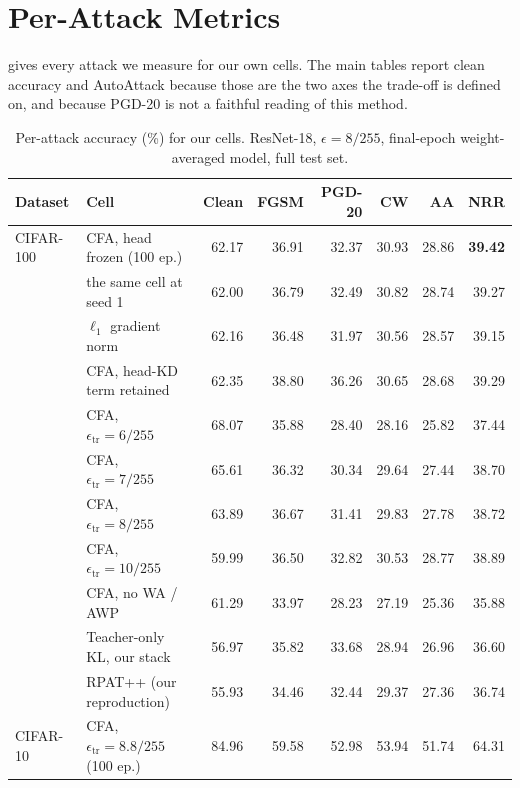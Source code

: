 \section{Per-Attack Metrics}
\label{app:fullmetrics}

 gives every attack we measure for our own cells. The main tables report clean
accuracy and AutoAttack because those are the two axes the trade-off is defined on, and because
PGD-20 is not a faithful reading of this method.

\begin{table}[!htbp]
  \centering \small \setlength{\tabcolsep}{4.5pt}
  \caption{Per-attack accuracy (\%) for our cells. ResNet-18, $\epsilon = 8/255$, final-epoch
  weight-averaged model, full test set.}
  \label{tab:fullmetrics}
  \begin{tabular}{llrrrrrr}
    \toprule
    Dataset & Cell & Clean & FGSM & PGD-20 & CW & AA & NRR \\
    \midrule
    CIFAR-100 & CFA, head frozen (100 ep.)   & 62.17 & 36.91 & 32.37 & 30.93 & 28.86 & \textbf{39.42} \\
              & \quad the same cell at seed 1 & 62.00 & 36.79 & 32.49 & 30.82 & 28.74 & 39.27 \\
              & \quad $\ell_1$ gradient norm  & 62.16 & 36.48 & 31.97 & 30.56 & 28.57 & 39.15 \\
              & CFA, head-KD term retained   & 62.35 & 38.80 & 36.26 & 30.65 & 28.68 & 39.29 \\
              & CFA, $\epsilon_{\mathrm{tr}} = 6/255$ & 68.07 & 35.88 & 28.40 & 28.16 & 25.82 & 37.44 \\
              & CFA, $\epsilon_{\mathrm{tr}} = 7/255$ & 65.61 & 36.32 & 30.34 & 29.64 & 27.44 & 38.70 \\
              & CFA, $\epsilon_{\mathrm{tr}} = 8/255$ & 63.89 & 36.67 & 31.41 & 29.83 & 27.78 & 38.72 \\
              & CFA, $\epsilon_{\mathrm{tr}} = 10/255$& 59.99 & 36.50 & 32.82 & 30.53 & 28.77 & 38.89 \\
              & CFA, no WA / AWP             & 61.29 & 33.97 & 28.23 & 27.19 & 25.36 & 35.88 \\
              & Teacher-only KL, our stack   & 56.97 & 35.82 & 33.68 & 28.94 & 26.96 & 36.60 \\
              & RPAT++ (our reproduction)    & 55.93 & 34.46 & 32.44 & 29.37 & 27.36 & 36.74 \\
    \midrule
    CIFAR-10  & CFA, $\epsilon_{\mathrm{tr}} = 8.8/255$ (100 ep.) & 84.96 & 59.58 & 52.98 & 53.94 & 51.74 & 64.31 \\

\end{tabular}
\end{table}
